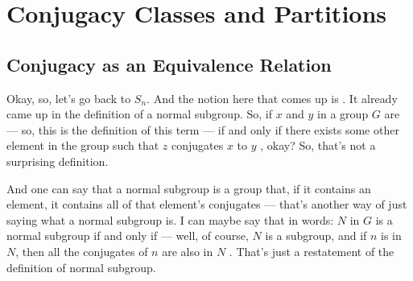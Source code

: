 \section{Conjugacy Classes and Partitions}

\subsection{Conjugacy as an Equivalence Relation}

\begin{speech}[01:13:37 - 01:15:12]
Okay, so, let's go back to $S_n$. And the notion here that comes up is . It already came up in the definition of a normal subgroup. So, if $x$ and $y$ in a group $G$ are   --- so, this is the definition of this term  --- if and only if there exists some other element in the group such that $z$ conjugates $x$ to $y$ , okay? So, that's not a surprising definition.

And one can say that a normal subgroup is a group that, if it contains an element, it contains all of that element's conjugates --- that's another way of just saying what a normal subgroup is. I can maybe say that in words: $N$ in $G$ is a normal subgroup if and only if --- well, of course, $N$ is a subgroup, and if $n$ is in $N$, then all the conjugates of $n$ are also in $N$ . That's just a restatement of the definition of normal subgroup.
\end{speech}

\begin{content}

\end{content}

